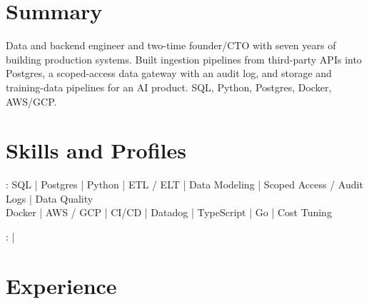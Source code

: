 \documentclass[print]{jack-resume}
\begin{document}
\pagecolor{darkmodeBackground}


\begin{minipage}[t][1cm][t]{.03\textwidth}
    \hfill
\end{minipage}

\section{Summary}
Data and backend engineer and two-time founder/CTO with seven years of building production systems. Built ingestion pipelines from third-party APIs into Postgres, a scoped-access data gateway with an audit log, and storage and training-data pipelines for an AI product. SQL, Python, Postgres, Docker, AWS/GCP.
\sectionsep

\section{Skills and Profiles}
:
SQL \hfill | \hfill
Postgres \hfill | \hfill
Python \hfill | \hfill
ETL / ELT \hfill | \hfill
Data Modeling \hfill | \hfill
Scoped Access / Audit Logs \hfill | \hfill
Data Quality \\
\hspace{1.0cm} Docker \hfill | \hfill
AWS / GCP \hfill | \hfill
CI/CD \hfill | \hfill
Datadog \hfill | \hfill
TypeScript \hfill | \hfill
Go \hfill | \hfill
Cost Tuning \\

\raggedright{
    :
      \href{https://www.linkedin.com/in/jack-sturtevant/}{ \ExternalLink} |
     \href{https://github.com/jacksturt}{ \ExternalLink}}

\section{Experience}
\end{document}
